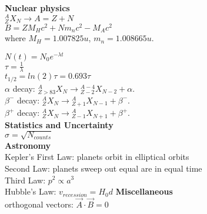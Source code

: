 \documentclass[12pt]{article}
\begin{document}
\begin{twocolumn}
\begin{flushleft}
{\bf Nuclear  physics} \\
${}^A_Z X_N \to   A=Z+N $ \\
\medskip
$\displaystyle B=Z M_H c^2 +N m_n c^2 - M_A c^2 $ \\
where $M_H=1.007825 u$, $m_n=1.008665u$.\\
\medskip

$\displaystyle N(t)=N_0 e^{-\lambda t} $\\
\medskip
$\displaystyle  \tau=\frac{1}{\lambda} $ \\
\medskip
$\displaystyle  t_{1/2}=ln(2) \tau=0.693 \tau $ \\
\medskip
$\displaystyle \alpha$ decay: ${}^A_{Z>83} X_N \to {}^{A-4}_{Z-2} X_{N-2}+\alpha$. \\
\medskip
$\displaystyle \beta^{-}$ decay: ${}^A_{Z} X_N \to {}^{A}_{Z+1} X_{N-1}+\beta^{-}$.\\
\medskip
$\displaystyle \beta^{+}$ decay: ${}^A_{Z} X_N \to {}^{A}_{Z-1} X_{N+1} +\beta^{+}$.\\
\medskip
{\bf Statistics and Uncertainty} \\
$\sigma = \sqrt{N_{counts}}$ \\
\medskip
{\bf Astronomy} \\
Kepler's First Law: planets orbit in elliptical orbits \\
\medskip
Second Law:  planets sweep out equal are in equal time \\
\medskip
Third Law: $p^2 \propto  a^3 $ \\
\medskip
Hubble's Law: $v_{recession} = H_0 d$
\medskip
{ \bf Miscellaneous} \\
orthogonal vectors: $\vec{A} \cdot \vec{B} = 0$
\end{flushleft}
\end{twocolumn}
\end{document}

